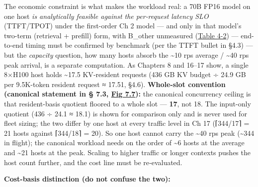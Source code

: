 The economic constraint is what makes the workload real: a 70B FP16
model on one host \emph{is analytically feasible against the per‑request
latency SLO} (TTFT/TPOT) under the first-order Ch 2 model --- and only
in that model's two-term (retrieval + prefill) form, with B\_other
unmeasured (\hyperref[tab:4.2]{Table 4-2}) --- end-to-end timing must be confirmed by
benchmark (per the TTFT bullet in §4.3) --- but the \emph{capacity}
question, how many hosts absorb the \textasciitilde10 rps average /
\textasciitilde40 rps peak arrival, is a separate computation. As
Chapters 8 and 16--17 show, a single 8×H100 host holds
\textasciitilde17.5 KV‑resident requests (436 GB KV budget ÷ 24.9 GB per
9.5K-token resident request ≈ 17.51, §4.6). \textbf{Whole-slot
convention (canonical statement in § 7.3, \hyperref[fig:7.7]{Fig 7.7}):} the canonical
concurrency ceiling is that resident-basis quotient floored to a whole
slot --- \textbf{17}, not 18. The input-only quotient (436 ÷ 24.1 ≈
18.1) is shown for comparison only and is never used for fleet sizing;
the two differ by one host at every traffic level in Ch 17 (⌈344/17⌉ =
21 hosts against ⌈344/18⌉ = 20). So one host cannot carry the
\textasciitilde40 rps peak (\textasciitilde344 in flight); the canonical
workload needs on the order of \textasciitilde6 hosts at the average and
\textasciitilde21 hosts at the peak. Scaling to higher traffic or longer
contexts pushes the host count further, and the cost line must be
re‑evaluated.

\textbf{Cost-basis distinction (do not confuse the two):}

